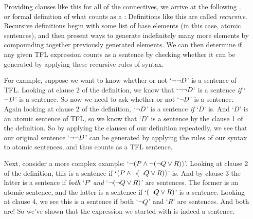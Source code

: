 Providing clauses like this for all of the connectives, we arrive at the following , or formal definition of what counts as a  :
Definitions like this are called \emph{recursive}. Recursive definitions begin with some list of base elements (in this case, atomic sentences), and then present ways to generate indefinitely many more elements by compounding together previously generated elements.  We can then determine if any given TFL expression counts as a sentence by checking whether it can be generated by applying these recursive rules of syntax.



For example, suppose we want to know whether or not `$\neg \neg D$' is a sentence of TFL. Looking at clause 2 of the definition, we know that `$\neg \neg D$' is a sentence \emph{if} `$\neg D$' is a sentence. So now we need to ask whether or not `$\neg D$' is a sentence. Again looking at  clause 2 of the definition, `$\neg D$' is a sentence \emph{if} `$D$' is. And `$D$' is an atomic sentence of TFL, so we know that `$D$' is a sentence by the clause 1 of the definition. So by applying the clauses of our definition repeatedly, we see that our original sentence `$\neg \neg D$' can be generated by applying the rules of our syntax to atomic sentences, and thus counts as a TFL sentence.


Next, consider a more complex example: `$\neg (P \wedge \neg (\neg Q \vee R))$'. Looking at clause 2 of the definition, this is a sentence if `$(P \wedge \neg (\neg Q \vee R))$' is. And by clause 3 the latter is a sentence if \emph{both} `$P$' \emph{and} `$\neg (\neg Q \vee R)$' are sentences. The former is an atomic sentence, and the latter is a sentence if `$(\neg Q \vee R)$' is a sentence. Looking at clause 4, we see this is a sentence if both `$\neg Q$' and `$R$' are sentences. And both are!  So we've shown that the expression we started with is indeed a sentence.

